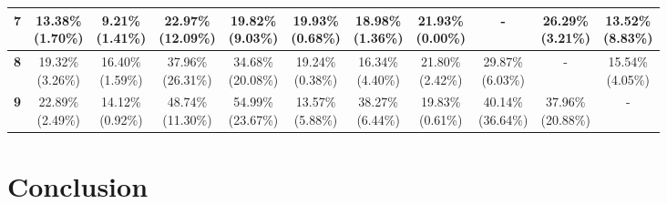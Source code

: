 \documentclass{report}
\begin{document}
\begin{table}
{{\begin{tabular}{|c|c|c|c|c|c|c|c|c|c|c|}
\textbf{7} & \makecell{13.38\% \\ (1.70\%)} & \makecell{9.21\% \\ (1.41\%)} & \makecell{22.97\% \\ (12.09\%)} & \makecell{19.82\% \\ (9.03\%)} & \makecell{19.93\% \\ (0.68\%)} & \makecell{18.98\% \\ (1.36\%)} & \makecell{21.93\% \\ (0.00\%)} & - & \makecell{26.29\% \\ (3.21\%)} & \makecell{13.52\% \\ (8.83\%)} \\ \hline
\textbf{8} & \makecell{19.32\% \\ (3.26\%)} & \makecell{16.40\% \\ (1.59\%)} & \makecell{37.96\% \\ (26.31\%)} & \makecell{34.68\% \\ (20.08\%)} & \makecell{19.24\% \\ (0.38\%)} & \makecell{16.34\% \\ (4.40\%)} & \makecell{21.80\% \\ (2.42\%)} & \makecell{29.87\% \\ (6.03\%)} & - & \makecell{15.54\% \\ (4.05\%)} \\ \hline
\textbf{9} & \makecell{22.89\% \\ (2.49\%)} & \makecell{14.12\% \\ (0.92\%)} & \makecell{48.74\% \\ (11.30\%)} & \makecell{54.99\% \\ (23.67\%)} & \makecell{13.57\% \\ (5.88\%)} & \makecell{38.27\% \\ (6.44\%)} & \makecell{19.83\% \\ (0.61\%)} & \makecell{40.14\% \\ (36.64\%)} & \makecell{37.96\% \\ (20.88\%)} & - \\ \hline
  \end{tabular}
}
}
\end{table}

\chapter{Conclusion}

\newpage

{}
\end{document}
